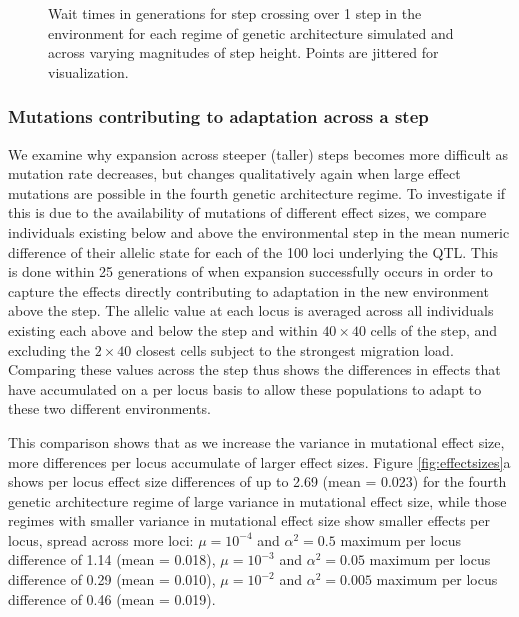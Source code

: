 \begin{figure}[h]
\centering
{}
\caption[Wait times for step crossing.]{Wait times in generations for step crossing over 1 step in the environment for each regime of genetic architecture simulated and across varying magnitudes of step height. Points are jittered for visualization.}
\label{fig:waittimes}
\end{figure}

\subsubsection{Mutations contributing to adaptation across a step}

We examine why expansion across steeper (taller) steps becomes more difficult as mutation rate decreases, but changes qualitatively again when large effect mutations are possible in the fourth genetic architecture regime. To investigate if this is due to the availability of mutations of different effect sizes, we compare individuals existing below and above the environmental step in the mean numeric difference of their allelic state for each of the 100 loci underlying the QTL. This is done within 25 generations of when expansion successfully occurs in order to capture the effects directly contributing to adaptation in the new environment above the step. The allelic value at each locus is averaged across all individuals existing each above and below the step and within $40\times40$ cells of the step, and excluding the $2\times40$ closest cells subject to the strongest migration load. Comparing these values across the step thus shows the differences in effects that have accumulated on a per locus basis to allow these populations to adapt to these two different environments.

This comparison shows that as we increase the variance in mutational effect size, more differences per locus accumulate of larger effect sizes. Figure \ref{fig:effectsizes}a shows per locus effect size differences of up to 2.69 %
(mean = 0.023) %
for the fourth genetic architecture regime of large variance in mutational effect size, while those regimes with smaller variance in mutational effect size show smaller effects per locus, spread across more loci: $\mu = 10^{-4}$ and $\alpha^2 = 0.5$ maximum per locus difference of 1.14 %
(mean = 0.018), %
$\mu = 10^{-3}$ and $\alpha^2 = 0.05$ maximum per locus difference of 0.29 %
(mean = 0.010), %
$\mu = 10^{-2}$ and $\alpha^2 = 0.005$ maximum per locus difference of 0.46 %
(mean = 0.019). %

